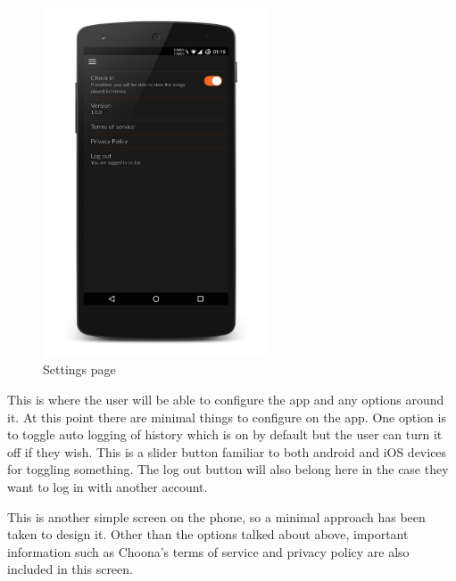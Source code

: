 \noindent
\begin{figure}[h!]
\centering
\includegraphics[width=0.6\textwidth]{./img/settingsframed.png}
\caption{Settings page}
\label{fig:settingspage}
\end{figure}

This is where the user will be able to configure the app and any options around it. At this point there are minimal things to configure on the app. One option is to toggle auto logging of history which is on by default but the user can turn it off if they wish. This is a slider button familiar to both android and iOS devices for toggling something. The log out button will also belong here in the case they want to log in with another account. 

This is another simple screen on the phone, so a minimal approach has been taken to design it. Other than the options talked about above, important information such as Choona's terms of service and privacy policy are also included in this screen.